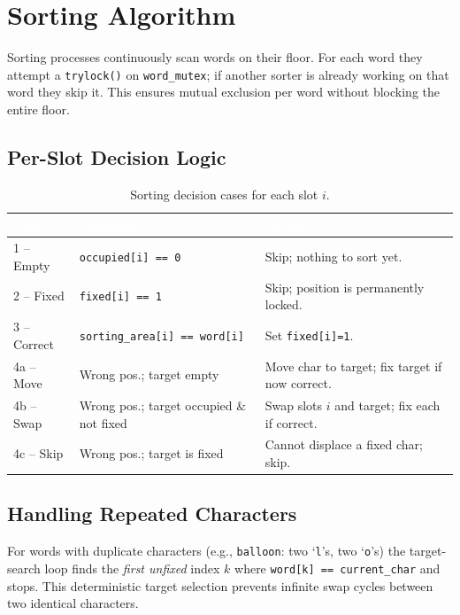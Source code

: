 \documentclass[12pt,a4paper]{article}
\newcommand{\code}[1]{\texttt{\small #1}}
\begin{document}
\section{Sorting Algorithm}

Sorting processes continuously scan words on their floor. For each word they
attempt a \code{trylock()} on \code{word\_mutex}; if another sorter is already
working on that word they skip it. This ensures mutual exclusion per word without
blocking the entire floor.

\subsection{Per-Slot Decision Logic}

\begin{table}[htbp]
\centering
\caption{Sorting decision cases for each slot $i$.}
\begin{tabularx}{\textwidth}{l l X}
\toprule
\rowcolor{darkblue}
\textcolor{white}{\textbf{Case}} &
\textcolor{white}{\textbf{Condition}} &
\textcolor{white}{\textbf{Action}} \\
\midrule
1 -- Empty   & \texttt{occupied[i] == 0} & Skip; nothing to sort yet. \\
\rowcolor{rowgray}
2 -- Fixed   & \texttt{fixed[i] == 1}    & Skip; position is permanently locked. \\
3 -- Correct & \texttt{sorting\_area[i] == word[i]} & Set \texttt{fixed[i]=1}. \\
\rowcolor{rowgray}
4a -- Move   & Wrong pos.; target empty  & Move char to target; fix target if now correct. \\
4b -- Swap   & Wrong pos.; target occupied \& not fixed & Swap slots $i$ and target; fix each if correct. \\
\rowcolor{rowgray}
4c -- Skip   & Wrong pos.; target is fixed & Cannot displace a fixed char; skip. \\
\bottomrule
\end{tabularx}
\end{table}

\subsection{Handling Repeated Characters}

For words with duplicate characters (e.g., \texttt{balloon}: two `\texttt{l}'s,
two `\texttt{o}'s) the target-search loop finds the \emph{first unfixed} index $k$
where \code{word[k] == current\_char} and stops. This deterministic target
selection prevents infinite swap cycles between two identical characters.
\end{document}
